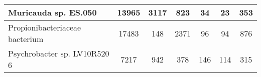 \begin{minipage}{0.91\textwidth}
\begin{adjustbox}{center}
\begin{tabular}{|l||c|c|c|c|c|c|}
\hline
Muricauda sp. ES.050 & \cellcolor[RGB]{235, 71, 71} 13965 & \cellcolor[RGB]{235, 71, 71} 3117 & \cellcolor[RGB]{253, 241, 241} 823 & \cellcolor[RGB]{227, 227, 252} 34 & \cellcolor[RGB]{223, 223, 251} 23 & \cellcolor[RGB]{241, 241, 253} 353 \\
\hline
Propionibacteriaceae bacterium & \cellcolor[RGB]{235, 71, 71} 17483 & \cellcolor[RGB]{232, 232, 252} 148 & \cellcolor[RGB]{235, 71, 71} 2371 & \cellcolor[RGB]{232, 232, 252} 96 & \cellcolor[RGB]{232, 232, 252} 94 & \cellcolor[RGB]{252, 232, 232} 876 \\
\hline
Psychrobacter sp. LV10R520 6 & \cellcolor[RGB]{235, 71, 71} 7217 & \cellcolor[RGB]{235, 71, 71} 942 & \cellcolor[RGB]{254, 246, 246} 378 & \cellcolor[RGB]{223, 223, 251} 146 & \cellcolor[RGB]{218, 218, 251} 114 & \cellcolor[RGB]{250, 250, 254} 315 \\
\hline
\end{tabular}
\end{adjustbox}
\end{minipage}
